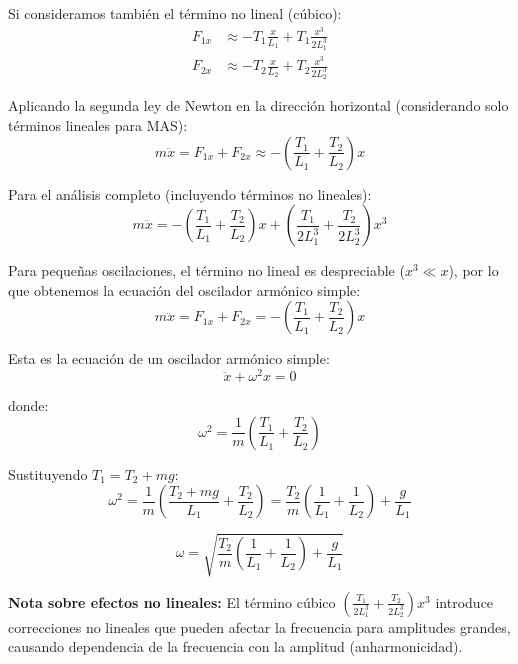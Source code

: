 \documentclass[
  11pt,
  letterpaper,
   addpoints,
  ]{exam}
\begin{document}
\begin{questions}
\begin{solution}
Si consideramos también el término no lineal (cúbico):
\begin{align}
F_{1x} &\approx -T_1 \frac{x}{L_1} + T_1 \frac{x^3}{2L_1^3} \\
F_{2x} &\approx -T_2 \frac{x}{L_2} + T_2 \frac{x^3}{2L_2^3}
\end{align}

Aplicando la segunda ley de Newton en la dirección horizontal (considerando solo términos lineales para MAS):
\begin{equation}
m\ddot{x} = F_{1x} + F_{2x} \approx -\left(\frac{T_1}{L_1} + \frac{T_2}{L_2}\right)x
\end{equation}

Para el análisis completo (incluyendo términos no lineales):
\begin{equation}
m\ddot{x} = -\left(\frac{T_1}{L_1} + \frac{T_2}{L_2}\right)x + \left(\frac{T_1}{2L_1^3} + \frac{T_2}{2L_2^3}\right)x^3
\end{equation}

Para pequeñas oscilaciones, el término no lineal es despreciable ($x^3 \ll x$), por lo que obtenemos la ecuación del oscilador armónico simple:
\begin{equation}
m\ddot{x} = F_{1x} + F_{2x} = -\left(\frac{T_1}{L_1} + \frac{T_2}{L_2}\right)x
\end{equation}

Esta es la ecuación de un oscilador armónico simple:
\begin{equation}
\ddot{x} + \omega^2 x = 0
\end{equation}

donde:
\begin{equation}
\omega^2 = \frac{1}{m}\left(\frac{T_1}{L_1} + \frac{T_2}{L_2}\right)
\end{equation}

Sustituyendo $T_1 = T_2 + mg$:
\begin{equation}
\omega^2 = \frac{1}{m}\left(\frac{T_2 + mg}{L_1} + \frac{T_2}{L_2}\right) = \frac{T_2}{m}\left(\frac{1}{L_1} + \frac{1}{L_2}\right) + \frac{g}{L_1}
\end{equation}

\begin{equation}
\boxed{\omega = \sqrt{\frac{T_2}{m}\left(\frac{1}{L_1} + \frac{1}{L_2}\right) + \frac{g}{L_1}}}
\end{equation}

\textbf{Nota sobre efectos no lineales:} El término cúbico $\left(\frac{T_1}{2L_1^3} + \frac{T_2}{2L_2^3}\right)x^3$ introduce correcciones no lineales que pueden afectar la frecuencia para amplitudes grandes, causando dependencia de la frecuencia con la amplitud (anharmonicidad).


\end{solution}
\end{questions}
\end{document}
